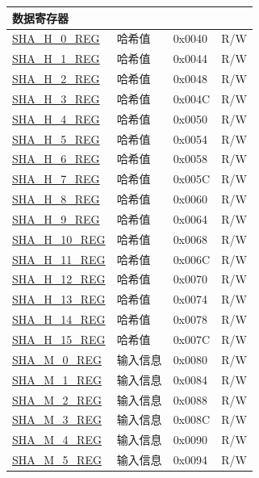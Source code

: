 \begin{longtable}{ | l| p{7.5cm} | p{1.3cm} | p{1cm} | }
\multicolumn{4}{|l|}{\textbf{数据寄存器}} \\ \hline
\hyperref[regdesc:SHAHNREG]{SHA\_H\_0\_REG} & 哈希值 & 0x0040 & R/W \\ \hline
\hyperref[regdesc:SHAHNREG]{SHA\_H\_1\_REG} & 哈希值 & 0x0044 & R/W \\ \hline
\hyperref[regdesc:SHAHNREG]{SHA\_H\_2\_REG} & 哈希值 & 0x0048 & R/W \\ \hline
\hyperref[regdesc:SHAHNREG]{SHA\_H\_3\_REG} & 哈希值 & 0x004C & R/W \\ \hline
\hyperref[regdesc:SHAHNREG]{SHA\_H\_4\_REG} & 哈希值 & 0x0050 & R/W \\ \hline
\hyperref[regdesc:SHAHNREG]{SHA\_H\_5\_REG} & 哈希值 & 0x0054 & R/W \\ \hline
\hyperref[regdesc:SHAHNREG]{SHA\_H\_6\_REG} & 哈希值 & 0x0058 & R/W \\ \hline
\hyperref[regdesc:SHAHNREG]{SHA\_H\_7\_REG} & 哈希值 & 0x005C & R/W \\ \hline
\hyperref[regdesc:SHAHNREG]{SHA\_H\_8\_REG} & 哈希值 & 0x0060 & R/W \\ \hline
\hyperref[regdesc:SHAHNREG]{SHA\_H\_9\_REG} & 哈希值 & 0x0064 & R/W \\ \hline
\hyperref[regdesc:SHAHNREG]{SHA\_H\_10\_REG} & 哈希值 & 0x0068 & R/W \\ \hline
\hyperref[regdesc:SHAHNREG]{SHA\_H\_11\_REG} & 哈希值 & 0x006C & R/W \\ \hline
\hyperref[regdesc:SHAHNREG]{SHA\_H\_12\_REG} & 哈希值 & 0x0070 & R/W \\ \hline
\hyperref[regdesc:SHAHNREG]{SHA\_H\_13\_REG} & 哈希值 & 0x0074 & R/W \\ \hline
\hyperref[regdesc:SHAHNREG]{SHA\_H\_14\_REG} & 哈希值 & 0x0078 & R/W \\ \hline
\hyperref[regdesc:SHAHNREG]{SHA\_H\_15\_REG} & 哈希值 & 0x007C & R/W \\ \hline
\hyperref[regdesc:SHAMNREG]{SHA\_M\_0\_REG} & 输入信息 & 0x0080 & R/W \\ \hline
\hyperref[regdesc:SHAMNREG]{SHA\_M\_1\_REG} & 输入信息 & 0x0084 & R/W \\ \hline
\hyperref[regdesc:SHAMNREG]{SHA\_M\_2\_REG} & 输入信息 & 0x0088 & R/W \\ \hline
\hyperref[regdesc:SHAMNREG]{SHA\_M\_3\_REG} & 输入信息 & 0x008C & R/W \\ \hline
\hyperref[regdesc:SHAMNREG]{SHA\_M\_4\_REG} & 输入信息 & 0x0090 & R/W \\ \hline
\hyperref[regdesc:SHAMNREG]{SHA\_M\_5\_REG} & 输入信息 & 0x0094 & R/W \\ \hline

\end{longtable}
